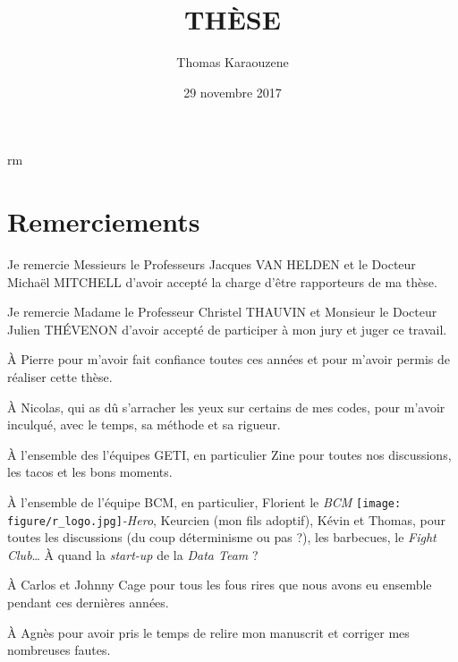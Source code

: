 \documentclass[12pt,a4paper,twoside]{ugathesis}
\title{THÈSE}
\author{Thomas Karaouzene}
\date{29 novembre 2017}
\theoremstyle{definition}
\theoremstyle{definition}
\theoremstyle{definition}
\theoremstyle{remark}
\begin{document}
  \maketitle

\frontmatter %
\pagestyle{empty} %



  \hypersetup{linkcolor=black}
  \setcounter{tocdepth}{3}
  \tableofcontents

  \listoftables

  \listoffigures
rm 


\mainmatter %
\pagestyle{fancyplain} %

\chapter*{Remerciements}\label{remerciements}

\newpage

Je remercie Messieurs le Professeurs Jacques VAN HELDEN et le Docteur
Michaël MITCHELL d'avoir accepté la charge d'être rapporteurs de ma
thèse.

Je remercie Madame le Professeur Christel THAUVIN et Monsieur le Docteur
Julien THÉVENON d'avoir accepté de participer à mon jury et juger ce
travail.

À Pierre pour m'avoir fait confiance toutes ces années et pour m'avoir
permis de réaliser cette thèse.

À Nicolas, qui as dû s'arracher les yeux sur certains de mes codes, pour
m'avoir inculqué, avec le temps, sa méthode et sa rigueur.

À l'ensemble des l'équipes GETI, en particulier Zine pour toutes nos
discussions, les tacos et les bons moments.

À l'ensemble de l'équipe BCM, en particulier, Florient le \emph{BCM}
\texttt{[image: figure/r\_logo.jpg]}\emph{-Hero},
Keurcien (mon fils adoptif), Kévin et Thomas, pour toutes les
discussions (du coup déterminisme ou pas ?), les barbecues, le
\emph{Fight Club}\ldots{} À quand la \emph{start-up} de la \emph{Data
Team} ?

À Carlos et Johnny Cage pour tous les fous rires que nous avons eu
ensemble pendant ces dernières années.

À Agnès pour avoir pris le temps de relire mon manuscrit et corriger mes
nombreuses fautes.
\end{document}
